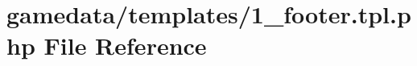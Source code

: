\hypertarget{1__footer_8tpl_8php}{\section{gamedata/templates/1\+\_\+footer.tpl.\+php File Reference}
\label{1__footer_8tpl_8php}
}

